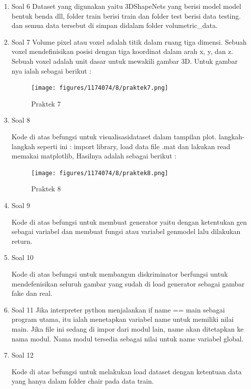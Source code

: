 \begin{enumerate}
	\item Soal 6
	\hfill\break
	Dataset yang digunakan yaitu 3DShapeNets yang berisi model model bentuk benda dll, folder train berisi train dan folder test berisi data testing. dan semua data tersebut di simpan didalam folder volumetric\_data.

    \item Soal 7
	\hfill\break
	Volume pixel atau voxel adalah titik dalam ruang tiga dimensi. Sebuah voxel mendefinisikan posisi dengan tiga koordinat dalam arah x, y, dan z. Sebuah voxel adalah unit dasar untuk mewakili gambar 3D. Untuk gambar nya ialah sebagai berikut :
    \begin{figure}[H]
		\texttt{[image: figures/1174074/8/praktek7.png]}
		\centering
		\caption{Praktek 7}
    \end{figure}

    \item Soal 8
	\hfill\break
	
	Kode di atas befungsi untuk visualisasidataset dalam tampilan plot. langkah-langkah seperti ini :
    import library, load data file .mat dan lakukan read memakai matplotlib, Hasilnya adalah sebagai berikut :
    \begin{figure}[H]
		\texttt{[image: figures/1174074/8/praktek8.png]}
		\centering
		\caption{Praktek 8}
    \end{figure}

    \item Soal 9
	\hfill\break
	
	Kode di atas befungsi untuk membuat generator yaitu dengan ketentukan gen sebagai variabel dan membuat fungsi atau variabel genmodel lalu dilakukan return. 

    \item Soal 10
	\hfill\break
	
	Kode di atas befungsi untuk membangun diskriminator berfungsi untuk mendefenisikan seluruh gambar yang sudah di load generator sebagai gambar fake dan real.

    \item Soal 11
	\hfill\break
	Jika interpreter python menjalankan if name == main sebagai program utama, itu ialah menetapkan variabel name untuk memiliki nilai main. Jika file ini sedang di impor dari modul lain, name akan ditetapkan ke nama modul. Nama modul tersedia sebagai nilai untuk name variabel global.

    \item Soal 12
	\hfill\break
	
	Kode di atas befungsi untuk melakukan load dataset dengan ketentuan data yang hanya dalam folder chair pada data train.


\end{enumerate}
